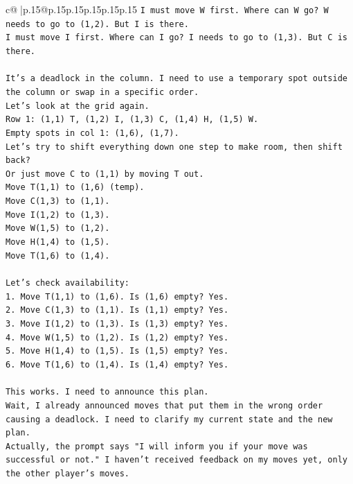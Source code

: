 \documentclass{article}
\begin{document}
{\begin{supertabular}{c@{$\;$}|p{.15\linewidth}@{}p{.15\linewidth}p{.15\linewidth}p{.15\linewidth}p{.15\linewidth}p{.15\linewidth}}
{{{\texttt{I must move W first. Where can W go? W needs to go to (1,2). But I is there.} \\
\texttt{I must move I first. Where can I go? I needs to go to (1,3). But C is there.} \\
\\ 
\texttt{It's a deadlock in the column. I need to use a temporary spot outside the column or swap in a specific order.} \\
\texttt{Let's look at the grid again.} \\
\texttt{Row 1: (1,1) T, (1,2) I, (1,3) C, (1,4) H, (1,5) W.} \\
\texttt{Empty spots in col 1: (1,6), (1,7).} \\
\texttt{Let's try to shift everything down one step to make room, then shift back?} \\
\texttt{Or just move C to (1,1) by moving T out.} \\
\texttt{Move T(1,1) to (1,6) (temp).} \\
\texttt{Move C(1,3) to (1,1).} \\
\texttt{Move I(1,2) to (1,3).} \\
\texttt{Move W(1,5) to (1,2).} \\
\texttt{Move H(1,4) to (1,5).} \\
\texttt{Move T(1,6) to (1,4).} \\
\\ 
\texttt{Let's check availability:} \\
\texttt{1. Move T(1,1) to (1,6). Is (1,6) empty? Yes.} \\
\texttt{2. Move C(1,3) to (1,1). Is (1,1) empty? Yes.} \\
\texttt{3. Move I(1,2) to (1,3). Is (1,3) empty? Yes.} \\
\texttt{4. Move W(1,5) to (1,2). Is (1,2) empty? Yes.} \\
\texttt{5. Move H(1,4) to (1,5). Is (1,5) empty? Yes.} \\
\texttt{6. Move T(1,6) to (1,4). Is (1,4) empty? Yes.} \\
\\ 
\texttt{This works. I need to announce this plan.} \\
\texttt{Wait, I already announced moves that put them in the wrong order causing a deadlock. I need to clarify my current state and the new plan.} \\
\texttt{Actually, the prompt says "I will inform you if your move was successful or not." I haven't received feedback on my moves yet, only the other player's moves.} \\
}}}
\end{supertabular}}
\end{document}
